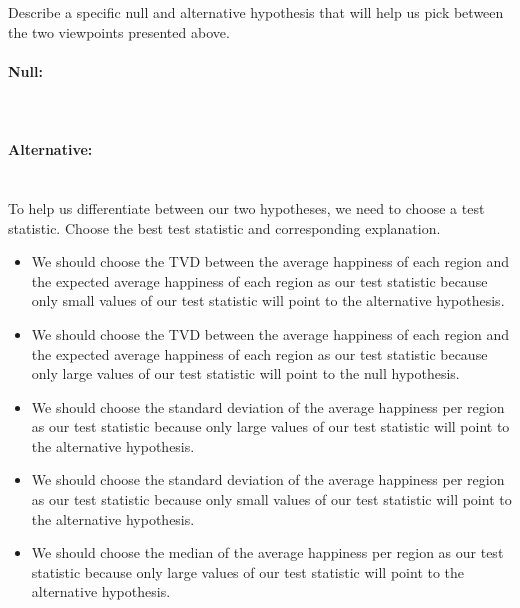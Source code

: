 \begin{enumerate}
\newpage
{}  Describe a specific null and alternative hypothesis that will help us pick between the two viewpoints presented above.\\ \\
\textbf{Null:} \\ \\ \\ \\
\textbf{Alternative:} \\ \\ \\
 To help us differentiate between our two hypotheses, we need to choose a test statistic. Choose the best test statistic and corresponding explanation. 
\begin{itemize}[label = \bubble]
\item We should choose the TVD between the average happiness of each region and the expected average happiness of each region as our test statistic because only small values of our test statistic will point to the alternative hypothesis.
\item We should choose the TVD between the average happiness of each region and the expected average happiness of each region as our test statistic because only large values of our test statistic will point to the null hypothesis.
\item We should choose the standard deviation of the average happiness per region as our test statistic because only large values of our test statistic will point to the alternative hypothesis. 
\item We should choose the standard deviation of the average happiness per region as our test statistic because only small values of our test statistic will point to the alternative hypothesis. 
\item We should choose the median of the average happiness per region as our test statistic because only large values of our test statistic will point to the alternative hypothesis.
\end{itemize}
\end{enumerate}
